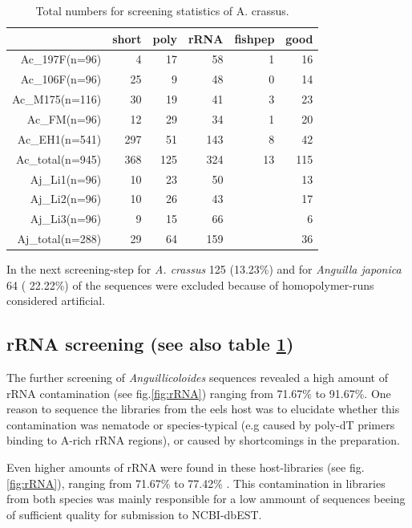 \documentclass[12pt,a4paper]{article}
\begin{document}
\begin{table}[ht]
\begin{center}
\begin{tabular}{rrrrrr}
  \hline
 & short & poly & rRNA & fishpep & good \\ 
  \hline
Ac\_197F(n=96) &   4 &  17 &  58 &   1 &  16 \\ 
  Ac\_106F(n=96) &  25 &   9 &  48 &   0 &  14 \\ 
  Ac\_M175(n=116) &  30 &  19 &  41 &   3 &  23 \\ 
  Ac\_FM(n=96) &  12 &  29 &  34 &   1 &  20 \\ 
  Ac\_EH1(n=541) & 297 &  51 & 143 &   8 &  42 \\ 
  Ac\_total(n=945) & 368 & 125 & 324 &  13 & 115 \\ 
  Aj\_Li1(n=96) &  10 &  23 &  50 &  &  13 \\ 
  Aj\_Li2(n=96) &  10 &  26 &  43 &  &  17 \\ 
  Aj\_Li3(n=96) &   9 &  15 &  66 &  &   6 \\ 
  Aj\_total(n=288) &  29 &  64 & 159 &  &  36 \\ 
   \hline
\end{tabular}
\caption{Total numbers for screening statistics of A. crassus.}
\label{tab:num}
\end{center}
\end{table}
In the next screening-step for \textit{A. crassus}
125
(13.23\%) and for
\textit{Anguilla japonica}  64 (
22.22\%) of the sequences were
excluded because of homopolymer-runs considered artificial.

\subsection*{rRNA screening (see also table \ref{tab:num})}

The further screening of \textit{Anguillicoloides} sequences revealed
a high amount of rRNA contamination (see fig.\ref{fig:rRNA}) ranging
from 71.67\% to
91.67\%. One reason to sequence
the libraries from the eels host was to elucidate whether this
contamination was nematode or species-typical (e.g caused by poly-dT
primers binding to A-rich rRNA regions), or caused by shortcomings in
the preparation.

Even higher amounts of rRNA were found in these host-libraries (see
fig. \ref{fig:rRNA}), ranging from
71.67\% to
77.42\% . This contamination in
libraries from both species was mainly responsible for a low ammount
of sequences beeing of sufficient quality for submission to
NCBI-dbEST.
\end{document}
